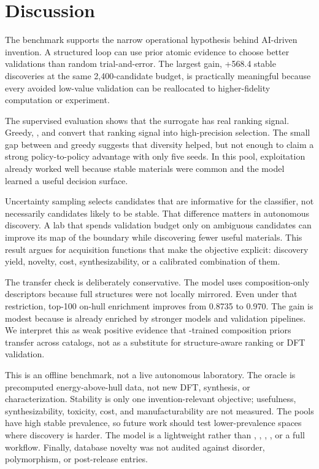 \section{Discussion}
\label{sec:discussion}

The benchmark supports the narrow operational hypothesis behind AI-driven invention. A structured loop can use prior atomic evidence to choose better validations than random trial-and-error. The largest gain, +568.4 stable discoveries at the same 2,400-candidate budget, is practically meaningful because every avoided low-value validation can be reallocated to higher-fidelity computation or experiment.

The supervised evaluation shows that the surrogate has real ranking signal. Greedy, \ucb, and \diverseucb convert that ranking signal into high-precision selection. The small gap between \diverseucb and greedy suggests that diversity helped, but not enough to claim a strong policy-to-policy advantage with only five seeds. In this pool, exploitation already worked well because stable materials were common and the model learned a useful decision surface.

Uncertainty sampling selects candidates that are informative for the classifier, not necessarily candidates likely to be stable. That difference matters in autonomous discovery. A lab that spends validation budget only on ambiguous candidates can improve its map of the boundary while discovering fewer useful materials. This result argues for acquisition functions that make the objective explicit: discovery yield, novelty, cost, synthesizability, or a calibrated combination of them.

The transfer check is deliberately conservative. The model uses composition-only descriptors because full \gnome structures were not locally mirrored. Even under that restriction, top-100 on-hull enrichment improves from 0.8735 to 0.970. The gain is modest because \gnome is already enriched by stronger models and validation pipelines. We interpret this as weak positive evidence that \mpdata-trained composition priors transfer across catalogs, not as a substitute for structure-aware ranking or DFT validation.

This is an offline benchmark, not a live autonomous laboratory. The oracle is precomputed energy-above-hull data, not new DFT, synthesis, or characterization. Stability is only one invention-relevant objective; usefulness, synthesizability, toxicity, cost, and manufacturability are not measured. The \mpdata pools have high stable prevalence, so future work should test lower-prevalence spaces where discovery is harder. The model is a lightweight \mlp rather than \chgnet, \macemp, \uma, \mattergen, or a full \matbench workflow. Finally, database novelty was not audited against disorder, polymorphism, or post-release entries.

